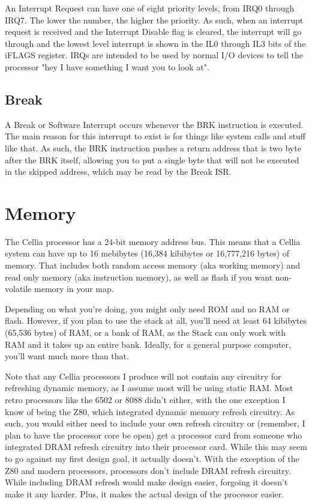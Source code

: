 \documentclass[letterpaper,12pt]{book}
\begin{document}
An Interrupt Request can have one of eight priority levels, from IRQ0 through IRQ7. The lower the number, the higher the priority. As such, when an interrupt request is received and the Interrupt Disable flag is cleared, the interrupt will go through and the lowest level interrupt is shown in the IL0 through IL3 bits of the iFLAGS register. IRQs are intended to be used by normal I/O devices to tell the processor "hey I have something I want you to look at".

\section{Break}

A Break or Software Interrupt occurs whenever the BRK instruction is executed. The main reason for this interrupt to exist is for things like system calls and stuff like that. As such, the BRK instruction pushes a return address that is two byte after the BRK itself, allowing you to put a single byte that will not be executed in the skipped address, which may be read by the Break ISR.

\chapter{Memory}

The Cellia processor has a 24-bit memory address bus. This means that a Cellia system can have up to 16 mebibytes (16,384 kibibytes or 16,777,216 bytes) of memory. That includes both random access memory (aka working memory) and read only memory (aka instruction memory), as well as flash if you want non-volatile memory in your map.

Depending on what you're doing, you might only need ROM and no RAM or flash. However, if you plan to use the stack at all, you'll need at least 64 kibibytes (65,536 bytes) of RAM, or a bank of RAM, as the Stack can only work with RAM and it takes up an entire bank. Ideally, for a general purpose computer, you'll want much more than that.

Note that any Cellia processors I produce will not contain any circuitry for refreshing dynamic memory, as I assume most will be using static RAM. Most retro processors like the 6502 or 8088 didn't either, with the one exception I know of being the Z80, which integrated dynamic memory refresh circuitry. As such, you would either need to include your own refresh circuitry or (remember, I plan to have the processor core be open) get a processor card from someone who integrated DRAM refresh circuitry into their processor card. While this may seem to go against my first design goal, it actually doesn't. With the exception of the Z80 and modern processors, processors don't include DRAM refresh circuitry. While including DRAM refresh would make design easier, forgoing it doesn't make it any harder. Plus, it makes the actual design of the processor easier.
\end{document}
